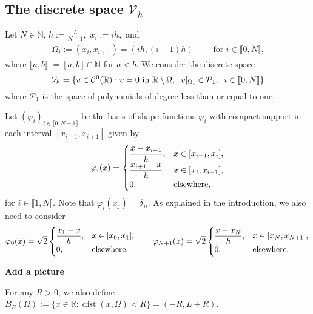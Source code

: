 \documentclass[10 pt]{article}
\newcommand\inter[1]{\llbracket #1\rrbracket}
\numberwithin{equation}{section}
\def\dist{\operatorname{dist}}
\def\R{\mathbb{R}}
\newcommand{\Bc}[1]{{\color{red}\textbf{#1}}}  %
\begin{document}
\subsection{The discrete space $\mathcal V_h$}

Let $N\in \mathbb N$, $h:=\frac{L}{N+1},$ $x_i:=ih,$ and 
\begin{align*}
\Omega_i:=(x_i,x_{i+1})=(ih,(i+1)h)\qquad \text{ for $i\in\inter{0,N}$,}
\end{align*}
where $\inter{a,b}:=[a,b]\cap\mathbb{N}$ for $a<b$. We consider the discrete space
%
\begin{equation}\label{Vh:def}
    \mathcal V_h=\{v\in \mathcal C^0(\R): v=0 \textnormal{ in } \R\setminus \Omega, \;\; v|_{\Omega_i}\in \mathcal P_1, \;\;  i\in\inter{0,N}\}
\end{equation}
%
where $\mathcal P_1$ is the space of polynomials of degree less than or equal to one. 

Let $(\varphi_i)_{i\in\inter{0,N+1}}$ be the basis of shape functions $\varphi_i$ with compact support in each interval $[x_{i-1},x_{i+1}]$ given by
%
\begin{align}\label{eq:def_basis}
 \varphi_i(x)=\begin{cases}
        \displaystyle \frac{x-x_{i-1}}{h}, &x\in[x_{i-1},x_i], \\
        \displaystyle \frac{x_{i+1}-x}{h}, &x\in [x_i,x_{i+1}], \\
        0, &\textnormal{elsewhere},
    \end{cases}
\end{align}
for $i\in\inter{1,N}$.  Note that $\varphi_i(x_j)=\delta_{ji}$.  As explained in the introduction, we also need to consider 
%
\begin{align}\label{eq:def_basis_ext}
    \varphi_0(x)=\sqrt{2}\begin{cases}
        \displaystyle \frac{x_{1}-x}{h}, &x\in [x_0,x_{1}], \\
        0, &\textnormal{elsewhere},
    \end{cases} \qquad \varphi_{N+1}(x)=\sqrt{2}\begin{cases}
        \displaystyle \frac{x-x_{N}}{h}, &x\in[x_{N},x_{N+1}], \\
        0, &\textnormal{elsewhere.}
    \end{cases}
\end{align}
%

\Bc{Add a picture}

For any $R>0$, we also define $B_{R}(\Omega):=\{x\in\R:\dist(x,\Omega)<R\}=(-R,L+R)$.
\end{document}
